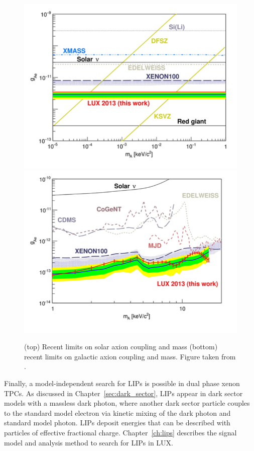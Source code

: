 \begin{figure}[htbp]
\begin{center}
\includegraphics[width=\textwidth]{figures/lxetpcs/axions1.png} \\
\includegraphics[width=\textwidth]{figures/lxetpcs/axions2.png}
\caption{(top) Recent limits on solar axion coupling and mass (bottom) recent limits on galactic axion coupling and mass. Figure taken from \cite{LUXAxions}. }
\label{fig:axions}
\end{center}
\end{figure}

Finally, a model-independent search for \ac{LIP}s is possible in dual phase xenon \ac{TPC}s. As discussed in Chapter~\ref{sec:dark_sector}, \ac{LIP}s appear in dark sector models with a massless dark photon, where another dark sector particle couples to the standard model electron via kinetic mixing of the dark photon and standard model photon. \ac{LIP}s deposit energies that can be described with particles of effective fractional charge. Chapter~\ref{ch:lips} describes the signal model and analysis method to search for \ac{LIP}s in \ac{LUX}. 






